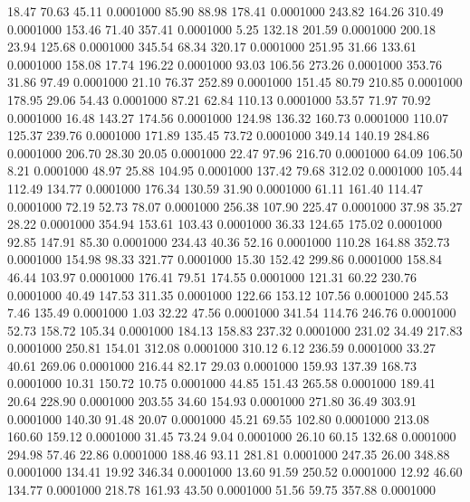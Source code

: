   18.47   70.63   45.11   0.0001000
  85.90   88.98  178.41   0.0001000
 243.82  164.26  310.49   0.0001000
 153.46   71.40  357.41   0.0001000
   5.25  132.18  201.59   0.0001000
 200.18   23.94  125.68   0.0001000
 345.54   68.34  320.17   0.0001000
 251.95   31.66  133.61   0.0001000
 158.08   17.74  196.22   0.0001000
  93.03  106.56  273.26   0.0001000
 353.76   31.86   97.49   0.0001000
  21.10   76.37  252.89   0.0001000
 151.45   80.79  210.85   0.0001000
 178.95   29.06   54.43   0.0001000
  87.21   62.84  110.13   0.0001000
  53.57   71.97   70.92   0.0001000
  16.48  143.27  174.56   0.0001000
 124.98  136.32  160.73   0.0001000
 110.07  125.37  239.76   0.0001000
 171.89  135.45   73.72   0.0001000
 349.14  140.19  284.86   0.0001000
 206.70   28.30   20.05   0.0001000
  22.47   97.96  216.70   0.0001000
  64.09  106.50    8.21   0.0001000
  48.97   25.88  104.95   0.0001000
 137.42   79.68  312.02   0.0001000
 105.44  112.49  134.77   0.0001000
 176.34  130.59   31.90   0.0001000
  61.11  161.40  114.47   0.0001000
  72.19   52.73   78.07   0.0001000
 256.38  107.90  225.47   0.0001000
  37.98   35.27   28.22   0.0001000
 354.94  153.61  103.43   0.0001000
  36.33  124.65  175.02   0.0001000
  92.85  147.91   85.30   0.0001000
 234.43   40.36   52.16   0.0001000
 110.28  164.88  352.73   0.0001000
 154.98   98.33  321.77   0.0001000
  15.30  152.42  299.86   0.0001000
 158.84   46.44  103.97   0.0001000
 176.41   79.51  174.55   0.0001000
 121.31   60.22  230.76   0.0001000
  40.49  147.53  311.35   0.0001000
 122.66  153.12  107.56   0.0001000
 245.53    7.46  135.49   0.0001000
   1.03   32.22   47.56   0.0001000
 341.54  114.76  246.76   0.0001000
  52.73  158.72  105.34   0.0001000
 184.13  158.83  237.32   0.0001000
 231.02   34.49  217.83   0.0001000
 250.81  154.01  312.08   0.0001000
 310.12    6.12  236.59   0.0001000
  33.27   40.61  269.06   0.0001000
 216.44   82.17   29.03   0.0001000
 159.93  137.39  168.73   0.0001000
  10.31  150.72   10.75   0.0001000
  44.85  151.43  265.58   0.0001000
 189.41   20.64  228.90   0.0001000
 203.55   34.60  154.93   0.0001000
 271.80   36.49  303.91   0.0001000
 140.30   91.48   20.07   0.0001000
  45.21   69.55  102.80   0.0001000
 213.08  160.60  159.12   0.0001000
  31.45   73.24    9.04   0.0001000
  26.10   60.15  132.68   0.0001000
 294.98   57.46   22.86   0.0001000
 188.46   93.11  281.81   0.0001000
 247.35   26.00  348.88   0.0001000
 134.41   19.92  346.34   0.0001000
  13.60   91.59  250.52   0.0001000
  12.92   46.60  134.77   0.0001000
 218.78  161.93   43.50   0.0001000
  51.56   59.75  357.88   0.0001000
